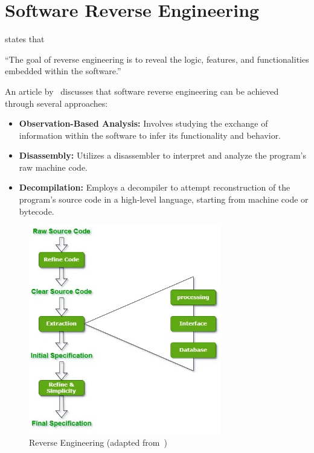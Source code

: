 \section{Software Reverse Engineering}  
\citep{digitalai_reverse_engineering} states that 
\begin{tcolorbox}[colback=gray!10, colframe=gray!20]
	``The goal of reverse engineering is to reveal the logic, features, and functionalities embedded within the software.''
\end{tcolorbox}

An article by~\citep{twoFacesOfSRE} discusses that software reverse engineering can be achieved through several approaches:
\begin{itemize}
    \item \textbf{Observation-Based Analysis:} Involves studying the exchange of information within the software to infer its functionality and behavior.
    \item \textbf{Disassembly:} Utilizes a disassembler to interpret and analyze the program's raw machine code.
    \item \textbf{Decompilation:} Employs a decompiler to attempt reconstruction of the program’s source code in a high-level language, starting from machine code or bytecode.
\end{itemize}

\begin{figure}[H]
    \centering
    \includegraphics[width=0.75\textwidth]{figures/Reverse-Engineering.png}
    \caption{Reverse Engineering (adapted from~\cite{geeksforgeeks2024})}
	\label{fig_background_reverse_engineering}
\end{figure}

